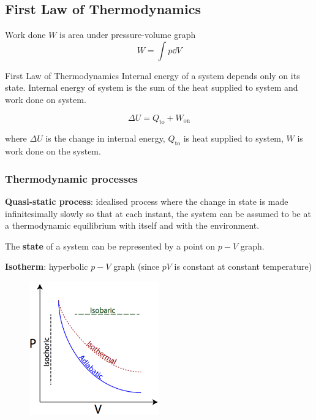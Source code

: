 \subsection{First Law of Thermodynamics}
Work done $W$ is area under pressure-volume graph
\[ W=\int p \dd{V} \]

\begin{defn}{First Law of Thermodynamics}{}
Internal energy of a system depends only on its state. Internal energy of system is the sum of the heat supplied to system and work done on system.

\begin{equation}
\Delta U = Q_\text{to} + W_\text{on}
\end{equation}

where $\Delta U$ is the change in internal energy, $Q_\text{to}$ is heat supplied to system, $W$ is work done on the system.
\end{defn}

\subsubsection{Thermodynamic processes}
\textbf{Quasi-static process}: idealised process where the change in state is made infinitesimally slowly so that at each instant, the system can be assumed to be at a thermodynamic equilibrium with itself and with the environment.

The \textbf{state} of a system can be represented by a point on $p-V$ graph.

\textbf{Isotherm}: hyperbolic $p-V$ graph (since $pV$ is constant at constant temperature)

\begin{figure}[H]
    \centering
    \includegraphics[width=0.5\textwidth]{images/thermodynamic_processes.png}
\end{figure}

